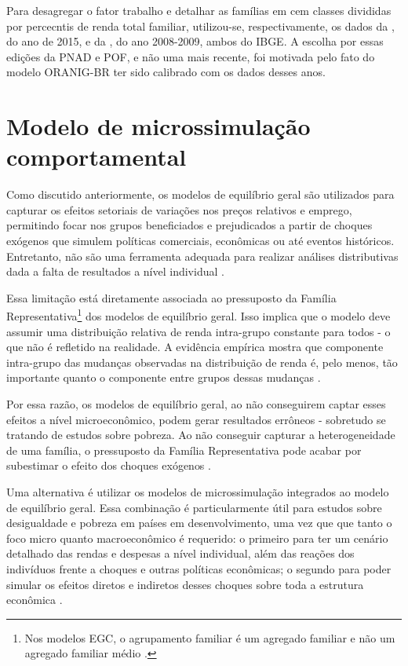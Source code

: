 Para desagregar o fator trabalho e detalhar as famílias em cem classes divididas por percecntis de renda total familiar, utilizou-se, respectivamente, os dados da , do ano de 2015, e da , do ano 2008-2009, ambos do IBGE. A escolha por essas edições da PNAD e POF, e não uma mais recente, foi motivada pelo fato do modelo ORANIG-BR ter sido calibrado com os dados desses anos.



\section{Modelo de microssimulação comportamental} \label{sec:microssimulacao}

Como discutido anteriormente, os modelos de equilíbrio geral são utilizados para capturar os efeitos setoriais de variações nos preços relativos e emprego, permitindo focar nos grupos beneficiados e prejudicados a partir de choques exógenos que simulem políticas comerciais, econômicas ou até eventos históricos. Entretanto, não são uma ferramenta adequada para realizar análises distributivas dada a falta de resultados a nível individual \cite{tiberti17}.

Essa limitação está diretamente associada ao pressuposto da Família Representativa\footnote{Nos modelos EGC, o agrupamento familiar é um agregado familiar e não um agregado familiar médio \cite{tiberti17}.} dos modelos de equilíbrio geral. Isso implica que o modelo deve assumir uma distribuição relativa de renda intra-grupo constante para todos - o que não é refletido na realidade. A evidência empírica mostra que componente intra-grupo das mudanças observadas na distribuição de renda é, pelo menos, tão importante quanto o componente entre grupos dessas mudanças \cite{colombo08}.

Por essa razão, os modelos de equilíbrio geral, ao não conseguirem captar esses efeitos a nível microeconômico, podem gerar resultados errôneos - sobretudo se tratando de estudos sobre pobreza. Ao não conseguir capturar a heterogeneidade de uma família, o pressuposto da Família Representativa pode acabar por subestimar o efeito dos choques exógenos \cite{colombo08}. 

Uma alternativa é utilizar os modelos de microssimulação integrados ao modelo de equilíbrio geral. Essa combinação é particularmente útil para estudos sobre desigualdade e pobreza em países em desenvolvimento, uma vez que que tanto o foco micro quanto macroeconômico é requerido: o primeiro para ter um cenário detalhado das rendas e despesas a nível individual, além das reações dos indivíduos frente a choques e outras políticas econômicas; o segundo para poder simular os efeitos diretos e indiretos desses choques sobre toda a estrutura econômica \cite{tiberti17, klevmarken22}.

